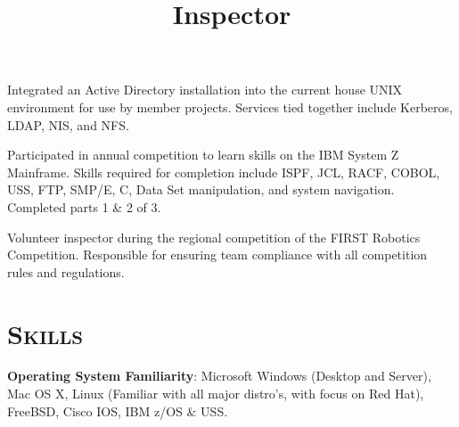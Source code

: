 \begin{resume}
\begin{position}
Integrated an Active Directory installation into the current house UNIX environment for use by member projects. Services tied together include Kerberos, LDAP, NIS, and NFS. 
\end{position}


\begin{position}
Participated in annual competition to learn skills on the IBM System Z Mainframe. Skills required for completion include ISPF, JCL, RACF, COBOL, USS, FTP, SMP/E, C, Data Set manipulation, and system navigation. Completed parts 1 \& 2 of 3. 
\end{position}

\title{Inspector}
\begin{position}
Volunteer inspector during the regional competition of the FIRST Robotics Competition. Responsible for ensuring team compliance with all competition rules and regulations.
\end{position}




\section{\textsc{Skills}}

\textbf{Operating System Familiarity}: Microsoft Windows (Desktop and Server), Mac OS X, Linux (Familiar with all major distro's, with focus on Red Hat), FreeBSD, Cisco IOS, IBM z/OS \& USS.


\end{resume}
